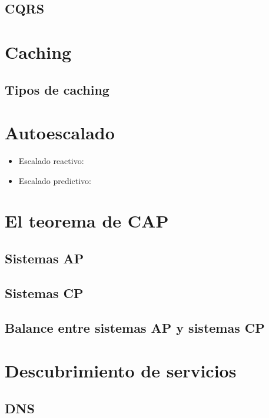 \documentclass[11pt,a4paper]{article}
\begin{document}
\subsection{CQRS}

\section{Caching}

\subsection{Tipos de caching}

\section{Autoescalado}

\begin{itemize}
\item Escalado reactivo:
\item Escalado predictivo:
\end{itemize}

\section{El teorema de CAP}

\subsection{Sistemas AP}

\subsection{Sistemas CP}

\subsection{Balance entre sistemas AP y sistemas CP}

\section{Descubrimiento de servicios}

\subsection{DNS}
\end{document}
